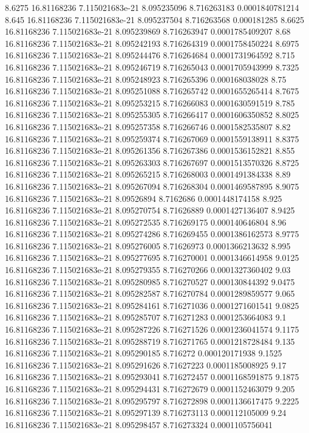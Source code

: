 {8.6275 16.81168236 7.115021683e-21 8.095235096 8.716263183 0.0001840781214
8.645 16.81168236 7.115021683e-21 8.095237504 8.716263568 0.000181285
8.6625 16.81168236 7.115021683e-21 8.095239869 8.716263947 0.0001785409207
8.68 16.81168236 7.115021683e-21 8.095242193 8.716264319 0.0001758450224
8.6975 16.81168236 7.115021683e-21 8.095244476 8.716264684 0.0001731964592
8.715 16.81168236 7.115021683e-21 8.095246719 8.716265043 0.0001705943999
8.7325 16.81168236 7.115021683e-21 8.095248923 8.716265396 0.000168038028
8.75 16.81168236 7.115021683e-21 8.095251088 8.716265742 0.0001655265414
8.7675 16.81168236 7.115021683e-21 8.095253215 8.716266083 0.0001630591519
8.785 16.81168236 7.115021683e-21 8.095255305 8.716266417 0.0001606350852
8.8025 16.81168236 7.115021683e-21 8.095257358 8.716266746 0.0001582535807
8.82 16.81168236 7.115021683e-21 8.095259374 8.716267069 0.0001559138911
8.8375 16.81168236 7.115021683e-21 8.095261356 8.716267386 0.0001536152821
8.855 16.81168236 7.115021683e-21 8.095263303 8.716267697 0.0001513570326
8.8725 16.81168236 7.115021683e-21 8.095265215 8.716268003 0.0001491384338
8.89 16.81168236 7.115021683e-21 8.095267094 8.716268304 0.0001469587895
8.9075 16.81168236 7.115021683e-21 8.09526894 8.7162686 0.0001448174158
8.925 16.81168236 7.115021683e-21 8.095270754 8.71626889 0.0001427136407
8.9425 16.81168236 7.115021683e-21 8.095272535 8.716269175 0.000140646804
8.96 16.81168236 7.115021683e-21 8.095274286 8.716269455 0.0001386162573
8.9775 16.81168236 7.115021683e-21 8.095276005 8.71626973 0.0001366213632
8.995 16.81168236 7.115021683e-21 8.095277695 8.716270001 0.0001346614958
9.0125 16.81168236 7.115021683e-21 8.095279355 8.716270266 0.0001327360402
9.03 16.81168236 7.115021683e-21 8.095280985 8.716270527 0.000130844392
9.0475 16.81168236 7.115021683e-21 8.095282587 8.716270784 0.0001289859577
9.065 16.81168236 7.115021683e-21 8.095284161 8.716271036 0.0001271601541
9.0825 16.81168236 7.115021683e-21 8.095285707 8.716271283 0.0001253664083
9.1 16.81168236 7.115021683e-21 8.095287226 8.716271526 0.0001236041574
9.1175 16.81168236 7.115021683e-21 8.095288719 8.716271765 0.0001218728484
9.135 16.81168236 7.115021683e-21 8.095290185 8.716272 0.000120171938
9.1525 16.81168236 7.115021683e-21 8.095291626 8.71627223 0.0001185008925
9.17 16.81168236 7.115021683e-21 8.095293041 8.716272457 0.0001168591875
9.1875 16.81168236 7.115021683e-21 8.095294431 8.716272679 0.0001152463079
9.205 16.81168236 7.115021683e-21 8.095295797 8.716272898 0.0001136617475
9.2225 16.81168236 7.115021683e-21 8.095297139 8.716273113 0.000112105009
9.24 16.81168236 7.115021683e-21 8.095298457 8.716273324 0.0001105756041
}

